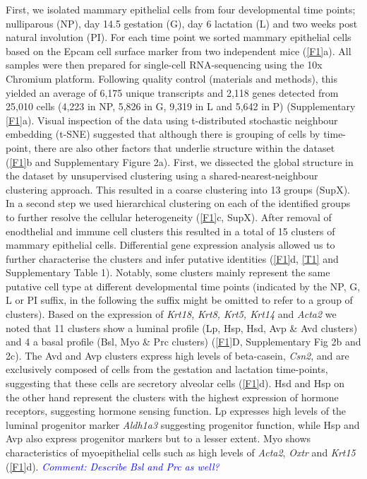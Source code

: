 \documentclass[titlepage, 12pt, oneside]{amsart}
\newcommand{\comment}[1]{\textit{\textcolor{blue}{Comment: #1}}}
\begin{document}
First, we isolated mammary epithelial cells from four developmental time points; nulliparous (NP), day 14.5 gestation (G), day 6 lactation (L) and two weeks post natural involution (PI).
For each time point we sorted mammary epithelial cells based on the Epcam cell surface marker from two independent mice (\autoref{F1}a).
All samples were then prepared for single-cell RNA-sequencing using the 10x Chromium platform\autocite{Zheng2017}.
Following quality control (materials and methods), this yielded an average of 6,175 unique transcripts and 2,118 genes detected from 25,010 cells (4,223 in NP, 5,826 in G, 9,319 in L and 5,642 in P) (Supplementary \autoref{F1}a).
Visual inspection of the data using t-distributed stochastic neighbour embedding (t-SNE) suggested that although there is grouping of cells by time-point, there are also other factors that underlie structure within the dataset (\autoref{F1}b and Supplementary Figure 2a).
First, we dissected the global structure in the dataset by unsupervised clustering using a shared-nearest-neighbour clustering approach.
This resulted in a coarse clustering into 13 groups (SupX).
In a second step we used hierarchical clustering on each of the identified groups to further resolve the cellular heterogeneity (\autoref{F1}c, SupX).
After removal of enodthelial and immune cell clusters this resulted in a total of 15 clusters of mammary epithelial cells.
Differential gene expression analysis allowed us to further characterise the clusters and infer putative identities (\autoref{F1}d, \autoref{T1} and Supplementary Table 1).
Notably, some clusters mainly represent the same putative cell type at different developmental time points (indicated by the NP, G, L or PI suffix, in the following the suffix might be omitted to refer to a group of clusters). 
Based on the expression of \textit{Krt18,} \textit{Krt8, Krt5, Krt14} and \textit{Acta2} we noted that 11 clusters show a luminal profile (Lp, Hsp, Hsd, Avp \& Avd clusters) and 4 a basal profile (Bsl, Myo \& Prc clusters) (\autoref{F1}D, Supplementary Fig 2b and 2c).
The Avd and Avp clusters express high levels of beta-casein, \textit{Csn2}, and are exclusively composed of cells from the gestation and lactation time-points, suggesting that these cells are secretory alveolar cells (\autoref{F1}d).
Hsd and Hsp on the other hand represent the clusters with the highest expression of hormone receptors, suggesting hormone sensing function.
Lp expresses high levels of the luminal progenitor marker \textit{Aldh1a3} suggesting progenitor function, while Hsp and Avp also express progenitor markers but to a lesser extent.
Myo shows characteristics of myoepithelial cells such as high levels of \textit{Acta2}, \textit{Oxtr} and \textit{Krt15} (\autoref{F1}d).
\comment{Describe Bsl and Prc as well?}
\end{document}
